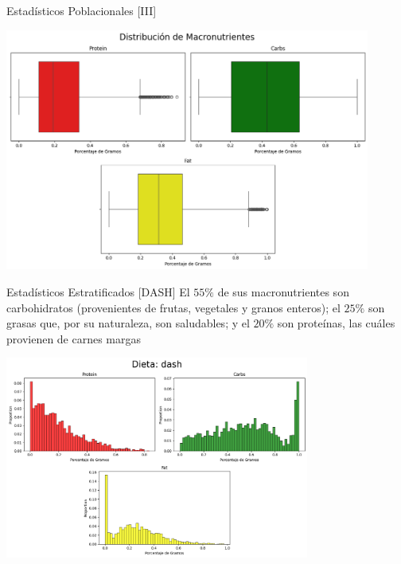 \documentclass{beamer}
\begin{document}
    \begin{frame}{Estadísticos Poblacionales [III]}
        \begin{center}
            \includegraphics[width=0.9\textwidth]{Resources/2_02_plot_01.png}
        \end{center}
    \end{frame}

    \begin{frame}{Estadísticos Estratificados [DASH]}
        El $55\%$ de sus macronutrientes son carbohidratos 
        (provenientes de frutas, vegetales y granos enteros); 
        el $25\%$ son grasas que, por su naturaleza, son saludables; 
        y el $20\%$ son proteínas, las cuáles provienen de carnes margas
        \begin{center}
            \includegraphics[width=0.75\textwidth]{Resources/2_03_plot_01.png}
        \end{center}
    \end{frame}
\end{document}
